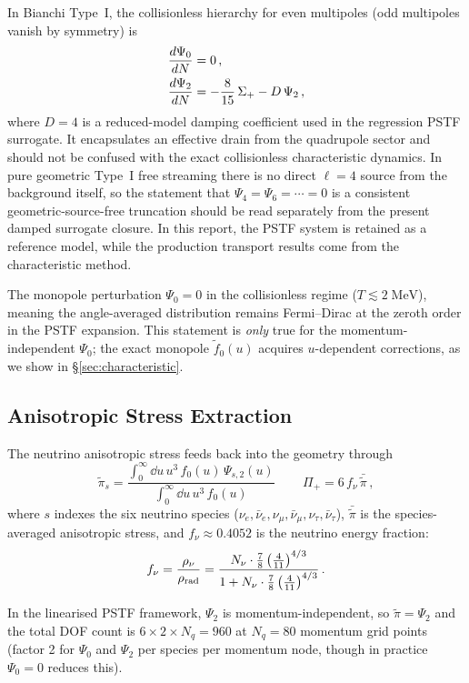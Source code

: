 In Bianchi Type~I, the collisionless hierarchy for even multipoles (odd multipoles vanish by symmetry) is
\begin{align}
\frac{d\Psi_0}{dN} &= 0\,,\label{eq:psi0}\\
\frac{d\Psi_2}{dN} &= -\frac{8}{15}\,\Sigma_+ - D\,\Psi_2\,,\label{eq:psi2}
\end{align}
where $D = 4$ is a reduced-model damping coefficient used in the regression PSTF surrogate.  It encapsulates an effective drain from the quadrupole sector and should not be confused with the exact collisionless characteristic dynamics.  In pure geometric Type~I free streaming there is no direct $\ell=4$ source from the background itself, so the statement that $\Psi_4 = \Psi_6 = \cdots = 0$ is a consistent geometric-source-free truncation should be read separately from the present damped surrogate closure.  In this report, the PSTF system is retained as a reference model, while the production transport results come from the characteristic method.

The monopole perturbation $\Psi_0 = 0$ in the collisionless regime ($T \lesssim 2\;\mathrm{MeV}$), meaning the angle-averaged distribution remains Fermi--Dirac at the zeroth order in the PSTF expansion.  This statement is \emph{only} true for the momentum-independent $\Psi_0$; the exact monopole $\tilde{f}_0(u)$ acquires $u$-dependent corrections, as we show in \S\ref{sec:characteristic}.

\subsection{Anisotropic Stress Extraction}

The neutrino anisotropic stress feeds back into the geometry through
\begin{equation}
\tilde\pi_s = \frac{\int_0^\infty \dd u\,u^3\,f_0(u)\,\Psi_{s,2}(u)}{\int_0^\infty \dd u\,u^3\,f_0(u)} \,\qquad \Pi_+ = 6\,f_\nu\,\bar{\tilde\pi}\,,\label{eq:stress}
\end{equation}
where $s$ indexes the six neutrino species ($\nu_e, \bar\nu_e, \nu_\mu, \bar\nu_\mu, \nu_\tau, \bar\nu_\tau$), $\bar{\tilde\pi}$ is the species-averaged anisotropic stress, and $f_\nu \approx 0.4052$ is the neutrino energy fraction:
\begin{equation}
f_\nu = \frac{\rho_\nu}{\rho_{\rm rad}} = \frac{N_\nu \cdot \frac{7}{8}\left(\frac{4}{11}\right)^{4/3}}{1 + N_\nu \cdot \frac{7}{8}\left(\frac{4}{11}\right)^{4/3}}\,.
\end{equation}

In the linearised PSTF framework, $\Psi_2$ is momentum-independent, so $\tilde\pi = \Psi_2$ and the total DOF count is $6 \times 2 \times N_q = 960$ at $N_q = 80$ momentum grid points (factor 2 for $\Psi_0$ and $\Psi_2$ per species per momentum node, though in practice $\Psi_0 = 0$ reduces this).

